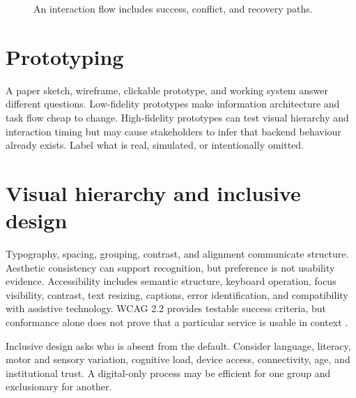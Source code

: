 \begin{figure}[H]
\centering
{}
\caption{An interaction flow includes success, conflict, and recovery paths.}
\label{fig:interaction-flow}
\end{figure}

\section{Prototyping}
A paper sketch, wireframe, clickable prototype, and working system answer different questions. Low-fidelity prototypes make information architecture and task flow cheap to change. High-fidelity prototypes can test visual hierarchy and interaction timing but may cause stakeholders to infer that backend behaviour already exists. Label what is real, simulated, or intentionally omitted.

\section{Visual hierarchy and inclusive design}
Typography, spacing, grouping, contrast, and alignment communicate structure. Aesthetic consistency can support recognition, but preference is not usability evidence. Accessibility includes semantic structure, keyboard operation, focus visibility, contrast, text resizing, captions, error identification, and compatibility with assistive technology. WCAG 2.2 provides testable success criteria, but conformance alone does not prove that a particular service is usable in context \citep{w3cwcag22}.

Inclusive design asks who is absent from the default. Consider language, literacy, motor and sensory variation, cognitive load, device access, connectivity, age, and institutional trust. A digital-only process may be efficient for one group and exclusionary for another.

